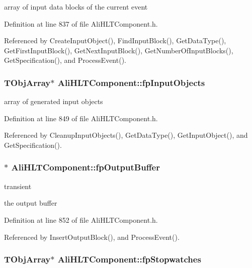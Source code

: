 array of input data blocks of the current event 

Definition at line 837 of file Ali\-HLTComponent.h.

Referenced by Create\-Input\-Object(), Find\-Input\-Block(), Get\-Data\-Type(), Get\-First\-Input\-Block(), Get\-Next\-Input\-Block(), Get\-Number\-Of\-Input\-Blocks(), Get\-Specification(), and Process\-Event().
\subsubsection{\setlength{\rightskip}{0pt plus 5cm}TObj\-Array$\ast$ {\bf Ali\-HLTComponent::fp\-Input\-Objects}\hspace{0.3cm}{\tt  [private]}}\label{classAliHLTComponent_r9}


array of generated input objects 

Definition at line 849 of file Ali\-HLTComponent.h.

Referenced by Cleanup\-Input\-Objects(), Get\-Data\-Type(), Get\-Input\-Object(), and Get\-Specification().
\subsubsection{$\ast$ {\bf Ali\-HLTComponent::fp\-Output\-Buffer}\hspace{0.3cm}{\tt  [private]}}\label{classAliHLTComponent_r10}


transient 

the output buffer 

Definition at line 852 of file Ali\-HLTComponent.h.

Referenced by Insert\-Output\-Block(), and Process\-Event().
\subsubsection{\setlength{\rightskip}{0pt plus 5cm}TObj\-Array$\ast$ {\bf Ali\-HLTComponent::fp\-Stopwatches}\hspace{0.3cm}{\tt  [private]}}\label{classAliHLTComponent_r14}


